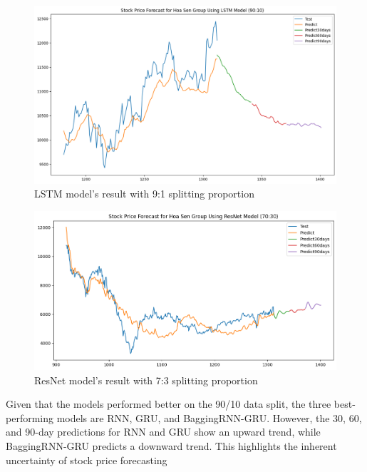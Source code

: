 \documentclass{ieeeojies}
\begin{document}
\begin{figure}[H]
  \centering
  \begin{minipage}{0.8\linewidth}
    \centering
    \includegraphics[width=\linewidth]{bibliography/LSTM_HSG_90-10.png}
    \caption{LSTM model's result with 9:1 splitting proportion}
    \label{fig21}
  \end{minipage}
\end{figure}
\begin{figure}[H]
  \centering
  \begin{minipage}{0.8\linewidth}
    \centering
    \includegraphics[width=\linewidth]{bibliography/ResNet_HSG_70-30.png}
    \caption{ResNet model's result with 7:3 splitting proportion}
    \label{mbbbggg}
  \end{minipage}
\end{figure}
Given that the models performed better on the 90/10 data split, the three best-performing models are RNN, GRU, and BaggingRNN-GRU. However, the 30, 60, and 90-day predictions for RNN and GRU show an upward trend, while BaggingRNN-GRU predicts a downward trend. This highlights the inherent uncertainty of stock price forecasting
\end{document}
